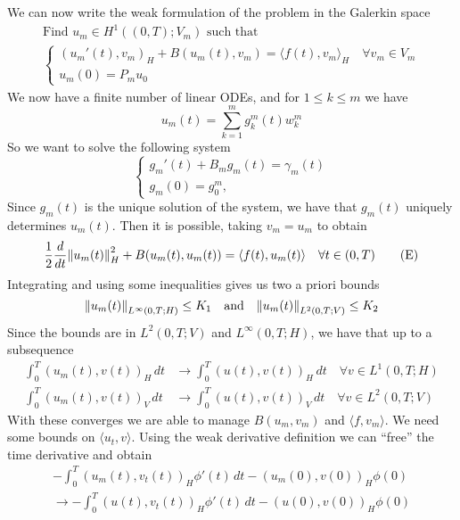 \begin{enumerate}
    We can now write the weak formulation of the problem in the Galerkin space
    \[
        \begin{split}
            \text{Find } u_m \in H^1((0, T); V_m) \text{ such that } \\
            \begin{cases}
                \left(u_m'(t), v_m\right)_H + B(u_m(t), v_m) = \langle f(t), v_m \rangle_H  \quad \forall v_m \in V_m \\
                u_m(0) = P_m u_0
            \end{cases}
        \end{split} 
    \]
    We now have a finite number of linear ODEs, and for \(1 \leq k \leq m\) we have
    \[
        u_m(t) = \sum_{k=1}^m g_k^m(t) w_k^m
    \]
    So we want to solve the following system
    \[
        \begin{cases}
            g_m'(t) + B_m g_m(t) = \gamma_m(t) \\
            g_m(0) = g_0^m, 
        \end{cases}
    \]
    Since \(g_m(t)\) is the unique solution of the system, we have that \(g_m(t)\) uniquely determines \(u_m(t)\). Then it is possible, taking \(v_m = u_m\) to obtain
    \[
        \frac{1}{2}\frac{d}{dt}\norm{u_m(t)}_H^2 + B(u_m(t), u_m(t)) = \langle f(t), u_m(t) \rangle \quad \forall t \in (0, T)
        \tag*{(E)}
    \]
    Integrating and using some inequalities gives us two a priori bounds
    \[
        \norm{u_m(t)}_{L^\infty(0, T; H)} \leq K_1 \quad \text{and} \quad \norm{u_m(t)}_{L^2(0, T; V)} \leq K_2
    \]
    Since the bounds are in \(L^2(0, T; V)\) and \(L^\infty(0, T; H)\), we have that up to  a subsequence 
    \begin{align*}
        \int_0^T \left(u_m(t), v(t)\right)_H \, dt &\to \int_0^T \left(u(t), v(t)\right)_H \, dt \quad \forall v \in L^1(0, T; H) \\
        \int_0^T \left(u_m(t), v(t)\right)_V \, dt &\to \int_0^T \left(u(t), v(t)\right)_V \, dt \quad \forall v \in L^2(0, T; V)
    \end{align*}
    With these converges we are able to manage \(B(u_m, v_m)\) and \(\langle f, v_m \rangle\). We need some bounds on \(\langle u_t, v \rangle\). Using the weak derivative definition we can ``free'' the time derivative and obtain
    \[
        \begin{split}
            - \int_0^T \left(u_m(t), v_t(t)\right)_H \phi'(t) \, dt - \left(u_m(0), v(0)\right)_H \phi(0) \\\to -\int_0^T \left(u(t), v_t(t)\right)_H \phi'(t) \, dt - \left(u(0), v(0)\right)_H \phi(0)

\end{split}\]
\end{enumerate}

